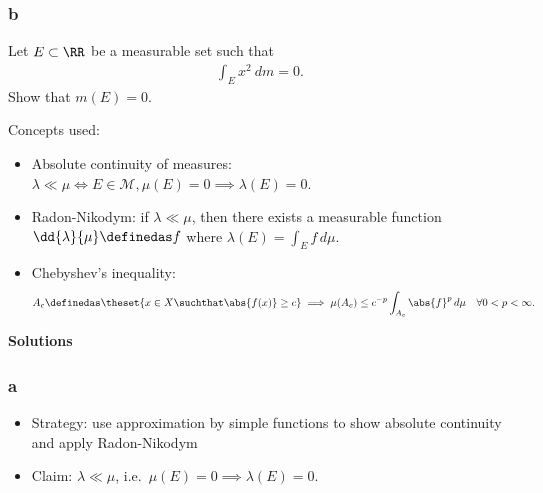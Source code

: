 \hypertarget{b-9}{%
\subsubsection{b}\label{b-9}}

Let \(E \subset \RR\) be a measurable set such that
\begin{align*}
\int_{E} x^{2} ~d m=0.
\end{align*} Show that \(m(E) = 0\).

\begin{solution}

Concepts used:

\begin{itemize}
\tightlist
\item
  Absolute continuity of measures:
  \(\lambda \ll \mu \iff E\in\mathcal{M}, \mu(E) = 0 \implies \lambda(E) = 0\).
\item
  Radon-Nikodym: if \(\lambda \ll \mu\), then there exists a measurable
  function \(\dd{\lambda}{\mu} \definedas f\) where
  \(\lambda(E) = \int_E f \,d\mu\).
\item
  Chebyshev's inequality:
  \begin{align*}  
  A_c \definedas \theset{ x\in X \suchthat \abs{f(x)} \geq c  } \implies \mu(A_c) \leq c^{-p} \int_{A_c} \abs{f}^p \,d\mu \quad \forall 0 < p < \infty
  .\end{align*}
\end{itemize}

\textbf{Solutions}

\hypertarget{a-10}{%
\subsubsection{a}\label{a-10}}

\begin{itemize}
\item
  Strategy: use approximation by simple functions to show absolute
  continuity and apply Radon-Nikodym
\item
  Claim: \(\lambda \ll \mu\),
  i.e.~\(\mu(E) = 0 \implies \lambda(E) = 0\).


\end{itemize}
\end{solution}
